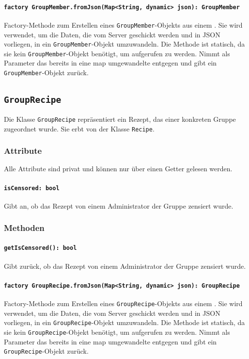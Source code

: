 \documentclass[parskip=full]{scrartcl}
\begin{document}
\paragraph{\texttt{factory GroupMember.fromJson(Map<String, dynamic> json): GroupMember}} Factory-Methode zum Erstellen eines \texttt{GroupMember}-Objekts aus einem . Sie wird verwendet, um die Daten, die vom Server geschickt werden und in \Gls{JSON} vorliegen, in ein \texttt{GroupMember}-Objekt umzuwandeln. Die Methode ist statisch, da sie kein \texttt{GroupMember}-Objekt benötigt, um aufgerufen zu werden. Nimmt als Parameter das bereits in eine \Gls{map} umgewandelte  entgegen und gibt ein \texttt{GroupMember}-Objekt zurück.
\newpage
\subsection{\texttt{GroupRecipe}}
Die Klasse \texttt{GroupRecipe} repräsentiert ein Rezept, das einer konkreten Gruppe zugeordnet wurde. Sie erbt von der Klasse \texttt{Recipe}.
\subsubsection*{Attribute}
Alle Attribute sind privat und können nur über einen Getter gelesen werden.
\paragraph{\texttt{isCensored: bool}}
Gibt an, ob das Rezept von einem Administrator der Gruppe zensiert wurde.
\subsubsection*{Methoden}
\paragraph{\texttt{getIsCensored(): bool}}
Gibt zurück, ob das Rezept von einem Administrator der Gruppe zensiert wurde.
\paragraph{\texttt{factory GroupRecipe.fromJson(Map<String, dynamic> json): GroupRecipe}} Factory-Methode zum Erstellen eines \texttt{GroupRecipe}-Objekts aus einem . Sie wird verwendet, um die Daten, die vom Server geschickt werden und in \Gls{JSON} vorliegen, in ein \texttt{GroupRecipe}-Objekt umzuwandeln. Die Methode ist statisch, da sie kein \texttt{GroupRecipe}-Objekt benötigt, um aufgerufen zu werden. Nimmt als Parameter das bereits in eine \Gls{map} umgewandelte  entgegen und gibt ein \texttt{GroupRecipe}-Objekt zurück.
\end{document}
